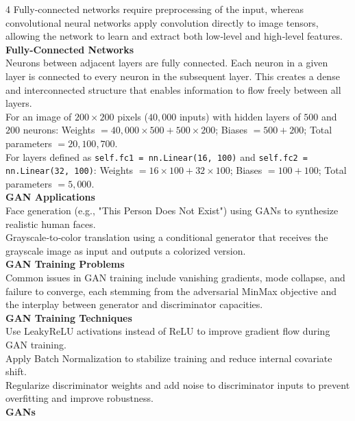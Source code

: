 \documentclass[8pt]{extarticle}
\begin{document}
\begin{multicols}{4}
Fully‑connected networks require preprocessing of the input, whereas convolutional neural networks apply convolution directly to image tensors, allowing the network to learn and extract both low‑level and high‑level features.\\
\vspace{2pt}\textbf{Fully-Connected Networks}\\
Neurons between adjacent layers are fully connected. Each neuron in a given layer is connected to every neuron in the subsequent layer. This creates a dense and interconnected structure that enables information to flow freely between all layers.\\
For an image of $200\times200$ pixels ($40{,}000$ inputs) with hidden layers of $500$ and $200$ neurons: Weights $= 40{,}000\times500 + 500\times200$; Biases $= 500 + 200$; Total parameters $= 20{,}100{,}700$.\\
For layers defined as \texttt{self.fc1 = nn.Linear(16, 100)} and \texttt{self.fc2 = nn.Linear(32, 100)}: Weights $= 16\times100 + 32\times100$; Biases $= 100 + 100$; Total parameters $= 5{,}000$.\\
\vspace{2pt}\textbf{GAN Applications}\\
Face generation (e.g., "This Person Does Not Exist") using GANs to synthesize realistic human faces.\\
Grayscale‑to‑color translation using a conditional generator that receives the grayscale image as input and outputs a colorized version.\\
\vspace{2pt}\textbf{GAN Training Problems}\\
Common issues in GAN training include vanishing gradients, mode collapse, and failure to converge, each stemming from the adversarial MinMax objective and the interplay between generator and discriminator capacities.\\
\vspace{2pt}\textbf{GAN Training Techniques}\\
Use LeakyReLU activations instead of ReLU to improve gradient flow during GAN training.\\
Apply Batch Normalization to stabilize training and reduce internal covariate shift.\\
Regularize discriminator weights and add noise to discriminator inputs to prevent overfitting and improve robustness.\\
\vspace{2pt}\textbf{GANs}\\


\end{multicols}
\end{document}
